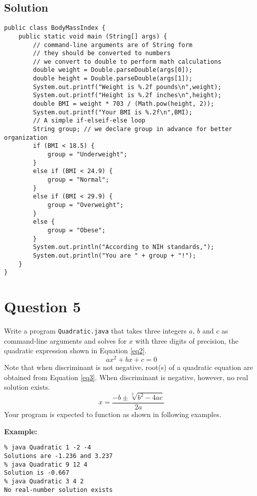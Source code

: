 \documentclass[12pt,letterpaper,twoside]{article}
\begin{document}
\subsection*{Solution}

\lstset{language=Java,tabsize=2}
\begin{lstlisting}
public class BodyMassIndex {
	public static void main (String[] args) {
		// command-line arguments are of String form
		// they should be converted to numbers
		// we convert to double to perform math calculations
		double weight = Double.parseDouble(args[0]);
		double height = Double.parseDouble(args[1]);
		System.out.printf("Weight is %.2f pounds\n",weight);
		System.out.printf("Height is %.2f inches\n",height);
		double BMI = weight * 703 / (Math.pow(height, 2));
		System.out.printf("Your BMI is %.2f\n",BMI);
		// A simple if-elseif-else loop
		String group; // we declare group in advance for better organization
		if (BMI < 18.5) {
			group = "Underweight";
		}
		else if (BMI < 24.9) {
			group = "Normal";
		}
		else if (BMI < 29.9) {
			group = "Overweight";
		}
		else {
			group = "Obese";
		}
		System.out.println("According to NIH standards,");
		System.out.println("You are " + group + "!");
	}
}
\end{lstlisting}

\section*{Question 5}

Write a program \texttt{Quadratic.java} that takes three integers $a$, $b$ and $c$ as command-line arguments and solves for $x$ with three digits of precision, the quadratic expression shown in Equation \ref{eq2}.
\begin{equation}
ax^2+bx+c=0
\label{eq2}
\end{equation}
Note that when discriminant is not negative, root(s) of a quadratic equation are obtained from Equation \ref{eq3}. When discriminant is negative, however, no real solution exists.
\begin{equation}
x = \frac{-b \pm \sqrt[2]{b^2-4ac}}{2a}
\label{eq3}
\end{equation}
Your program is expected to function as shown in following examples.

\textbf{Example:}
\begin{verbatim}
% java Quadratic 1 -2 -4
Solutions are -1.236 and 3.237
% java Quadratic 9 12 4
Solution is -0.667
% java Quadratic 3 4 2
No real-number solution exists
\end{verbatim}
\end{document}

